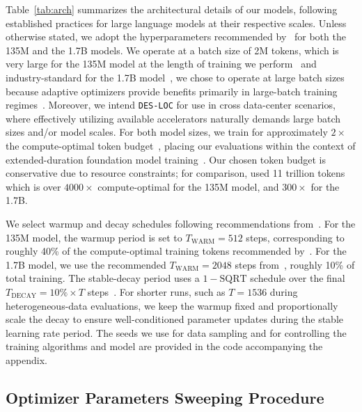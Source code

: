 Table~\ref{tab:arch} summarizes the architectural details of our models, following established practices for large
language models at their respective scales. Unless otherwise stated, we adopt the hyperparameters
recommended by~\citet{allal2025smollm2} for both the 135M and the 1.7B models. We operate at a
batch size of 2M tokens, which is very large for the 135M model at the length of training we
perform~\citep{zhang2025critical} and industry-standard for the 1.7B model~\citep{touvron2023llama2}, we
chose to operate at large batch sizes because adaptive optimizers provide benefits primarily in large-batch training regimes~\citep{kunstner2023noise}. Moreover, we intend \texttt{DES-LOC} for use in cross data-center scenarios, where effectively utilizing available accelerators naturally demands large batch sizes and/or model scales. For both model sizes, we train for approximately $2\times$ the compute-optimal token budget~\citep{hoffmann2022training}, placing our evaluations within the context of extended-duration foundation model training~\citep{allal2025smollm2}. Our chosen token budget is conservative due to resource constraints; for comparison, \citet{allal2025smollm2} used 11 trillion tokens which is over $4000\times$ compute-optimal for the 135M model, and $300\times$ for the 1.7B.

We select warmup and decay schedules following recommendations from~\citet{zhang2025critical,hagele2024scaling,allal2025smollm2}. For the 135M model, the warmup period is set to $T_{\text{WARM}} = 512$
steps, corresponding to roughly 40\% of the compute-optimal training tokens recommended by~\citet{zhang2025critical}. For the 1.7B model, we use the recommended $T_{\text{WARM}} = 2048$ steps from~\citet{allal2025smollm2}, roughly 10\% of total training. The stable-decay period uses a $1 - \text{SQRT}$ schedule over
the final $T_{\text{DECAY}} = 10\% \times T$ steps~\citep{hagele2024scaling}. For shorter runs, such as $T = 1536$ during heterogeneous-data evaluations, we keep the warmup fixed and proportionally scale the decay to ensure well-conditioned parameter updates during the stable learning rate period. The seeds we use for data sampling and for controlling the training algorithms and model are provided in the code accompanying the appendix.

\subsection{Optimizer Parameters Sweeping Procedure}
\label{sec:sweep}

